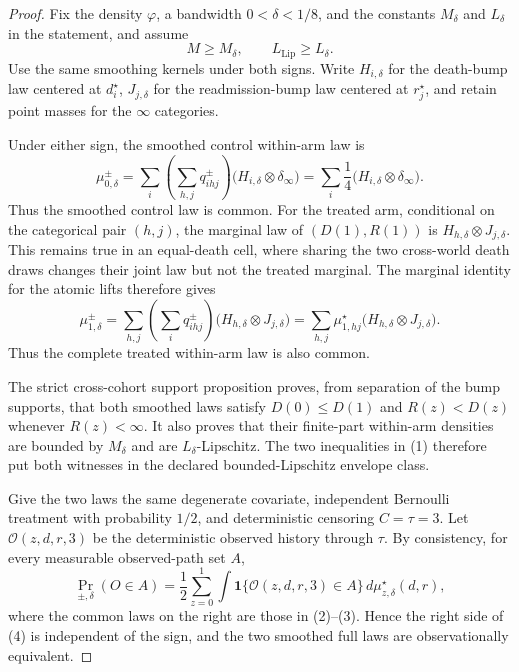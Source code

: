\documentclass{article}
\begin{document}
\begin{proof}
Fix the density \(\varphi\), a bandwidth \(0<\delta<1/8\), and the constants \(M_\delta\) and \(L_\delta\) in the statement, and assume
\[
 M\geq M_\delta,\qquad L_{\mathrm{Lip}}\geq L_\delta. \tag{1}
\]
Use the same smoothing kernels under both signs.  Write \(H_{i,\delta}\) for the death-bump law centered at \(d_i^\star\), \(J_{j,\delta}\) for the readmission-bump law centered at \(r_j^\star\), and retain point masses for the \(\infty\) categories.

Under either sign, the smoothed control within-arm law is
\[
 \mu_{0,\delta}^{\pm}
 =\sum_i\left(\sum_{h,j}q^\pm_{ihj}\right)
 \bigl(H_{i,\delta}\otimes\delta_\infty\bigr)
 =\sum_i\frac14\bigl(H_{i,\delta}\otimes\delta_\infty\bigr). \tag{2}
\]
Thus the smoothed control law is common.  For the treated arm, conditional on the categorical pair \((h,j)\), the marginal law of \((D(1),R(1))\) is \(H_{h,\delta}\otimes J_{j,\delta}\).  This remains true in an equal-death cell, where sharing the two cross-world death draws changes their joint law but not the treated marginal.  The marginal identity for the atomic lifts therefore gives
\[
 \mu_{1,\delta}^{\pm}
 =\sum_{h,j}\left(\sum_iq^\pm_{ihj}\right)
 \bigl(H_{h,\delta}\otimes J_{j,\delta}\bigr)
 =\sum_{h,j}\mu_{1,hj}^\star
 \bigl(H_{h,\delta}\otimes J_{j,\delta}\bigr). \tag{3}
\]
Thus the complete treated within-arm law is also common.

The strict cross-cohort support proposition proves, from separation of the bump supports, that both smoothed laws satisfy \(D(0)\leq D(1)\) and \(R(z)<D(z)\) whenever \(R(z)<\infty\).  It also proves that their finite-part within-arm densities are bounded by \(M_\delta\) and are \(L_\delta\)-Lipschitz.  The two inequalities in (1) therefore put both witnesses in the declared bounded-Lipschitz envelope class.

Give the two laws the same degenerate covariate, independent Bernoulli treatment with probability \(1/2\), and deterministic censoring \(C=\tau=3\).  Let \(\mathcal O(z,d,r,3)\) be the deterministic observed history through \(\tau\).  By consistency, for every measurable observed-path set \(A\),
\[
 \Pr_{\pm,\delta}(O\in A)
 =\frac12\sum_{z=0}^1
 \int\mathbf 1\{\mathcal O(z,d,r,3)\in A\}\,
 d\mu_{z,\delta}^{\star}(d,r), \tag{4}
\]
where the common laws on the right are those in (2)--(3).  Hence the right side of (4) is independent of the sign, and the two smoothed full laws are observationally equivalent.


\end{proof}
\end{document}
